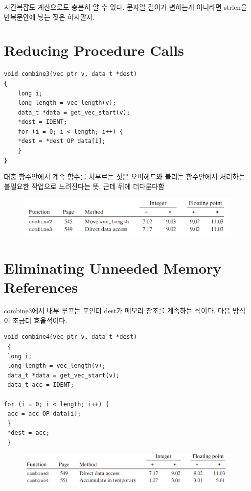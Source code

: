 시간복잡도 계산으로도 충분히 알 수 있다.
문자열 길이가 변하는게 아니라면 strlen을 반복문안에 넣는 짓은 하지말자.

\section{Reducing Procedure Calls}

\begin{lstlisting}[style = CStyle]
void combine3(vec_ptr v, data_t *dest)
{
    long i;
    long length = vec_length(v);
    data_t *data = get_vec_start(v);
    *dest = IDENT;
    for (i = 0; i < length; i++) {
    *dest = *dest OP data[i];
    }
}
\end{lstlisting}

대충 함수안에서 계속 함수를 쳐부르는 짓은 오버헤드와 불리는 함수안에서 처리하는 불필요한 작업으로 느려진다는 뜻.
근데 뒤에 더다룬다함


\begin{figure}[h!]
    \centering
    \includegraphics[scale=0.3]{pic/section5/pic3}
\end{figure}

\section{Eliminating Unneeded Memory References}

combine3에서 내부 루프는 포인터 dest가 메모리 참조를 계속하는 식이다.
다음 방식이 조금더 효율적이다.

\begin{lstlisting}[style = CStyle]
void combine4(vec_ptr v, data_t *dest)
 {
 long i;
 long length = vec_length(v);
 data_t *data = get_vec_start(v);
 data_t acc = IDENT;

for (i = 0; i < length; i++) {
 acc = acc OP data[i];
 }
 *dest = acc;
 }
\end{lstlisting}




\begin{figure}[h!]
    \centering
    \includegraphics[scale=0.3]{pic/section5/pic4}
\end{figure}



